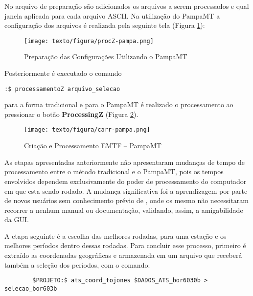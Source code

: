    No arquivo de preparação são adicionados os arquivos a serem processados e qual janela aplicada para cada arquivo ASCII. Na utilização do PampaMT a configuração dos arquivos é realizada pela seguinte tela (Figura \ref{procZ-pampa}):
    
    \begin{figure}[H]
        \caption{Preparação das Configurações Utilizando o PampaMT}
            \begin{center}
                \texttt{[image: texto/figura/procZ-pampa.png]}
            \end{center}
        \legend{\Fonte{\oautor}}
        \label{procZ-pampa}
    \end{figure}
    
    Posteriormente é executado o comando \begin{footnotesize}\verb|:$ processamentoZ arquivo_selecao|\end{footnotesize} para a forma tradicional e para o PampaMT é realizado o processamento ao pressionar o botão \textbf{ProcessingZ} (Figura \ref{carr-pampa}).
    
    \begin{figure}[H]
        \caption{Criação e Processamento EMTF -- PampaMT}
            \begin{center}
                \texttt{[image: texto/figura/carr-pampa.png]}
            \end{center}
        \legend{\Fonte{\oautor}}
        \label{carr-pampa}
    \end{figure}
    
    As etapas apresentadas anteriormente não apresentaram mudanças de tempo de processamento entre o método tradicional e o PampaMT, pois os tempos envolvidos dependem exclusivamente do poder de processamento do computador em que esta sendo rodado. A mudança significativa foi a aprendizagem por parte de novos usuários sem conhecimento prévio de , onde os mesmo não necessitaram recorrer a nenhum manual ou documentação, validando, assim, a amigabilidade da GUI. 
    
    A etapa seguinte é a escolha das melhores rodadas, para uma estação e os melhores períodos dentro dessas rodadas. Para concluir esse processo, primeiro é extraído as coordenadas geográficas e armazenada em um arquivo que receberá também a seleção dos períodos, com o comando:
    
        \begin{footnotesize}        
\begin{verbatim}
        $PROJETO:$ ats_coord_tojones $DADOS_ATS_bor6030b > selecao_bor603b
\end{verbatim}
\end{footnotesize}

